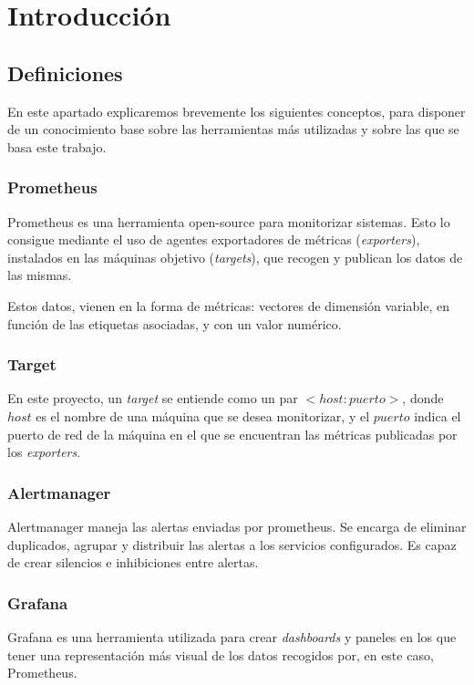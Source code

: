 \chapter{Introducción}
\label{ch:intro}

\section{Definiciones}
En este apartado explicaremos brevemente los siguientes conceptos, para disponer de un conocimiento base sobre las herramientas más utilizadas y sobre las que se basa este trabajo.

\subsection*{Prometheus}
Prometheus\cite{prometheus} es una herramienta open-source para monitorizar sistemas. Esto lo consigue mediante el uso de agentes exportadores de métricas (\textit{exporters}), instalados en las máquinas objetivo (\textit{targets}), que recogen y publican los datos de las mismas.

Estos datos, vienen en la forma de métricas: vectores de dimensión variable, en función de las etiquetas asociadas, y con un valor numérico.

\subsection*{Target}
En este proyecto, un \textit{target} se entiende como un par \textit{$<host:puerto>$}, donde \textit{$host$} es el nombre de una máquina que se desea monitorizar, y el $puerto$ indica el puerto de red de la máquina en el que se encuentran las métricas publicadas por los \textit{exporters}.

\subsection*{Alertmanager}
Alertmanager\cite{alertmanager} maneja las alertas enviadas por prometheus. Se encarga de eliminar duplicados, agrupar y distribuir las alertas a los servicios configurados. Es capaz de crear silencios e inhibiciones entre alertas.

\subsection*{Grafana}
Grafana\cite{grafana} es una herramienta utilizada para crear \textit{dashboards} y paneles en los que tener una representación más visual de los datos recogidos por, en este caso, Prometheus.


